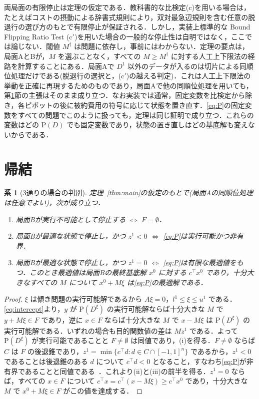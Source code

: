 \documentclass[11pt,a4paper]{ltjsarticle}
\theoremstyle{plain}
\newtheorem{corollary}[theorem]{系}
\theoremstyle{definition}
\theoremstyle{remark}
\newcommand{\Pb}{\mathrm{P}}
\begin{document}
両局面の有限停止は定理の仮定である．教科書的な比検定(c)を用いる場合は，たとえばコストの摂動による辞書式規則により，双対最急辺規則を含む任意の脱退行の選び方のもとで有限停止が保証される．しかし，実装上標準的な Bound Flipping Ratio Test (c$'$)を用いた場合の一般的な停止性は自明ではなく，ここでは論じない．閾値 $M^\dagger$ は問題に依存し，事前にはわからない．定理の要点は，局面AとBが，$M$ を選ぶことなく，すべての $M\ge M^\dagger$ に対する人工上下限法の経路を計算することにある．局面Aで $D^1$ 以外のデータが入るのは切片による同順位処理だけである(脱退行の選択と，(c$'$)の越える判定)．これは人工上下限法の挙動を正確に再現するためのものであり，局面Aで他の同順位処理を用いても，第\ref{sec:consequences}節の主張はそのまま成り立つ．なお実装では通常，固定変数を比検定から除き，各ピボットの後に被約費用の符号に応じて状態を置き直す．\eqref{eq:P}の固定変数をすべての問題でこのように扱っても，定理は同じ証明で成り立つ．これらの変数はどの $\Pb(D)$ でも固定変数であり，状態の置き直しはどの基底解も変えないからである．

\section{帰結}
\label{sec:consequences}

\begin{corollary}[3通りの場合の判別]
\label{cor:classification}
定理~\ref{thm:main}の仮定のもとで(局面Aの同順位処理は任意でよい)，次が成り立つ．
\begin{enumerate}[label=(\roman*)]
\item 局面Bが実行不可能として停止する $\iff$ $F=\emptyset$．
\item 局面Bが最適な状態で停止し，かつ $z^1<0$ $\iff$ \eqref{eq:P}は実行可能かつ非有界．
\item 局面Bが最適な状態で停止し，かつ $z^1=0$ $\iff$ \eqref{eq:P}は有限な最適値をもつ．このとき最適値は局面Bの最終基底解 $x^0$ に対する $c^\top x^0$ であり，十分大きなすべての $M$ について $x^0+M\xi$ は\eqref{eq:P}の最適解である．
\end{enumerate}
\end{corollary}
\begin{proof}
$\xi$ は傾き問題の実行可能解であるから $A\xi=0$，$l^1\le\xi\le u^1$ である．\eqref{eq:intercept}より，$y$ が $\Pb(D^\xi)$ の実行可能解ならば十分大きな $M$ で $y+M\xi\in F$ であり，逆に $x\in F$ ならば十分大きな $M$ で $x-M\xi$ は $\Pb(D^\xi)$ の実行可能解である．いずれの場合も目的関数値の差は $Mz^1$ である．よって $\Pb(D^\xi)$ が実行可能であることと $F\neq\emptyset$ は同値であり，(i)を得る．$F\neq\emptyset$ ならば $C$ は $F$ の後退錐であり，$z^1=\min\{c^\top d: d\in C\cap[-1,1]^n\}$ であるから，$z^1<0$ であることは後退錐のある $d$ について $c^\top d<0$ となること，すなわち\eqref{eq:P}が非有界であることと同値である~\cite{bertsimas1997}．これより(ii)と(iii)の前半を得る．$z^1=0$ ならば，すべての $x\in F$ について $c^\top x=c^\top(x-M\xi)\ge c^\top x^0$ であり，十分大きな $M$ で $x^0+M\xi\in F$ がこの値を達成する．
\end{proof}
\end{document}

